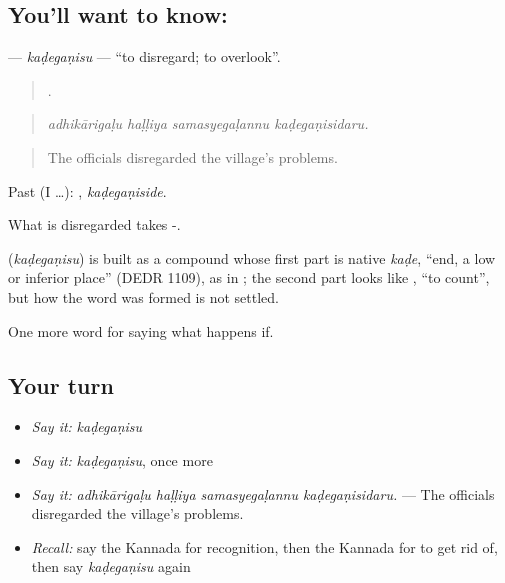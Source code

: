 \subsection*{You'll want to know: }
\textbf{} — \emph{kaḍegaṇisu} — \textquotedblleft{}to disregard; to overlook\textquotedblright{}.

\begin{quote}
   .
\end{quote}

\begin{quote}
\emph{adhikārigaḷu haḷḷiya samasyegaḷannu kaḍegaṇisidaru.}
\end{quote}

\begin{quote}
The officials disregarded the village's problems.
\end{quote}

Past (I …): , \emph{kaḍegaṇiside}.

What is disregarded takes -.

\begin{cousinweb}
\textbf{} (\emph{kaḍegaṇisu}) is built as a compound whose first part is native \emph{kaḍe}, \textquotedblleft{}end, a low or inferior place\textquotedblright{} (DEDR 1109), as in ; the second part looks like , \textquotedblleft{}to count\textquotedblright{}, but how the word was formed is not settled.
\end{cousinweb}

\begin{grammarlens}[title={What you've built}]
One more word for saying what happens if.
\end{grammarlens}

\subsection*{Your turn}
\begin{itemize}
\raggedright
  \item \emph{Say it:} \emph{kaḍegaṇisu}
  \item \emph{Say it:} \emph{kaḍegaṇisu}, once more
  \item \emph{Say it:} \emph{adhikārigaḷu haḷḷiya samasyegaḷannu kaḍegaṇisidaru.} — The officials disregarded the village's problems.
  \item \emph{Recall:} say the Kannada for recognition, then the Kannada for to get rid of, then say \emph{kaḍegaṇisu} again
\end{itemize}

